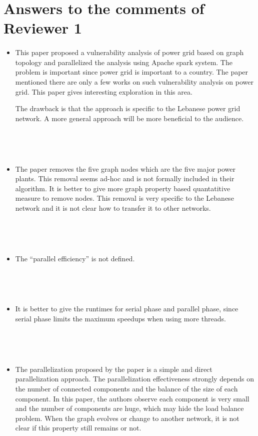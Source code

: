 \section{Answers to the comments of Reviewer 1}

\paragraph{}
\begin{itemize}
\item This paper proposed a vulnerability analysis of power grid based on graph topology and parallelized the analysis using Apache spark system. The problem is important since power grid is important to a country. The paper mentioned there are only a few works on such vulnerability analysis on power grid. This paper gives interesting exploration in this area. 

The drawback is that the approach is specific to the Lebanese power grid network. A more general approach will be more beneficial to the audience.

~


~

\item The paper removes the five graph nodes which are the five major power plants. This removal seems  ad-hoc and is not formally included in their algorithm. It is better to give more graph property based quantatitive measure to remove nodes. This removal is very specific to the Lebanese network and it is not clear how to transfer it to other networks.

~


~


\item The ``parallel efficiency'' is not defined.

~


~


\item It is better to give the runtimes for serial phase and parallel phase, since serial phase limits the maximum speedups when using more threads. 

~


~


\item The parallelization proposed by the paper is a simple and direct parallelization approach. The parallelization effectiveness strongly depends on the number of connected components and the balance of the size of each component. In this paper, the authors observe each component is very small and the number of components are huge, which may hide the load balance problem. When the graph evolves or change to another network, it is not clear if this property still remains or not.


\end{itemize}
